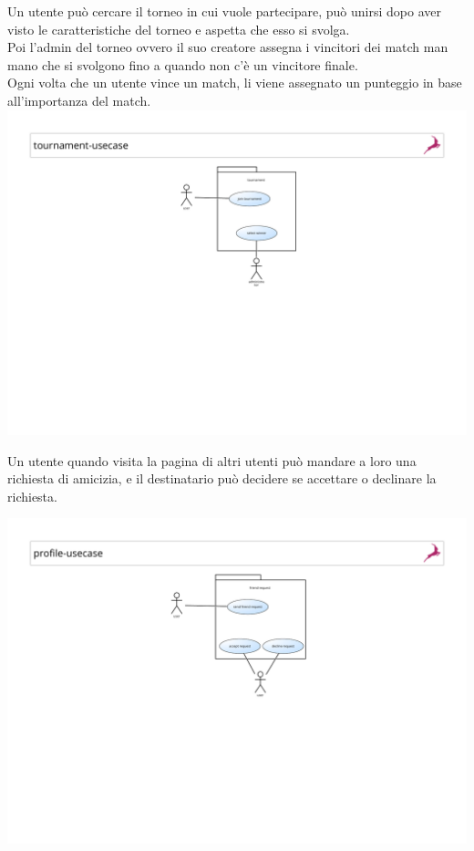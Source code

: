\documentclass{article}
\begin{document}
    \begin{center}
        Un utente può cercare il torneo in cui vuole partecipare, può unirsi dopo aver visto le caratteristiche del torneo e aspetta che esso si svolga. \\ 
        Poi l'admin del torneo ovvero il suo creatore assegna i vincitori dei match man mano che si svolgono fino a quando non c'è un vincitore finale.\\
        Ogni volta che un utente vince un match, li viene assegnato un punteggio in base all'importanza del match.
        \includegraphics[width=18cm]{UX/tournament-usecase}
    \end{center}
Un utente quando visita la pagina di altri utenti può mandare a loro una richiesta di amicizia, e il destinatario può decidere se accettare o declinare la richiesta.
    \begin{center}
        \includegraphics[width=18cm]{UX/profile-usecase}
    \end{center}
\end{document}
